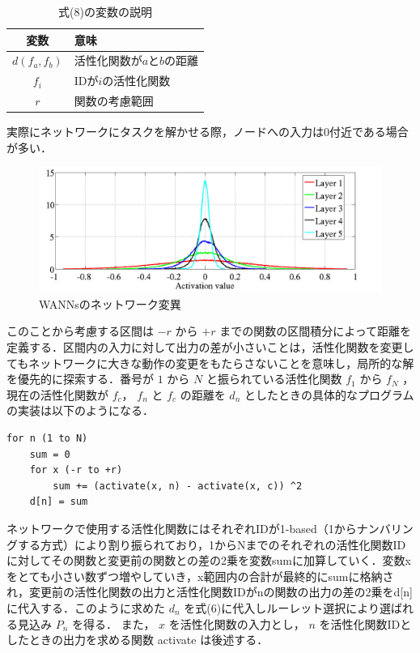 \begin{table}[h]
    \caption{式(8)の変数の説明}
    \centering
    \begin{tabular}{cl}
        \hline
        変数  & 意味 \\
        \hline \hline
        $d(f_{a}, f_{b})$ & 活性化関数が$a$と$b$の距離                 \\
        $f_{i}$           & IDが$i$の活性化関数                        \\
        $r$               & 関数の考慮範囲                             \\
        \hline
    \end{tabular}
\end{table}

実際にネットワークにタスクを解かせる際，ノードへの入力は0付近である場合が多い\cite{ノード入力}．

\begin{figure}[h]
    \begin{center}
        \includegraphics[width=120mm]{img/expinput.png}
        \caption{WANNsのネットワーク変異}
    \end{center}
\end{figure}

このことから考慮する区間は $ -r $ から $ +r $ までの関数の区間積分によって距離を定義する．区間内の入力に対して出力の差が小さいことは，活性化関数を変更してもネットワークに大きな動作の変更をもたらさないことを意味し，局所的な解を優先的に探索する．番号が $ 1 $ から $ N $ と振られている活性化関数 $ f_1 $ から $ f_N $ ，現在の活性化関数が $ f_c $， $ f_n $ と $ f_c $ の距離を $ d_n $ としたときの具体的なプログラムの実装は以下のようになる．

\begin{lstlisting}[caption=区間積分差のプログラム]
for n (1 to N)
    sum = 0
    for x (-r to +r)
        sum += (activate(x, n) - activate(x, c)) ^2
    d[n] = sum
\end{lstlisting}

ネットワークで使用する活性化関数にはそれぞれIDが1-based（1からナンバリングする方式）により割り振られており，1からNまでのそれぞれの活性化関数IDに対してその関数と変更前の関数との差の2乗を変数sumに加算していく．変数xをとても小さい数ずつ増やしていき，x範囲内の合計が最終的にsumに格納され，変更前の活性化関数の出力と活性化関数IDがnの関数の出力の差の2乗をd[n]に代入する．このように求めた $ d_n $ を式(6)に代入しルーレット選択により選ばれる見込み $ P_n $ を得る．
また， $ x $ を活性化関数の入力とし， $ n $ を活性化関数IDとしたときの出力を求める関数 activate は後述する．


